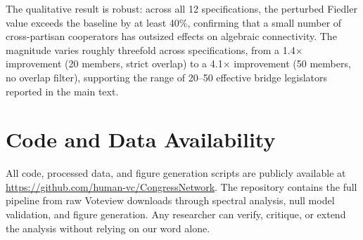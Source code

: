 \documentclass[12pt, a4paper]{article}
\begin{document}
The qualitative result is robust: across all 12 specifications, the perturbed Fiedler value exceeds the baseline by at least 40\%, confirming that a small number of cross-partisan cooperators has outsized effects on algebraic connectivity. The magnitude varies roughly threefold across specifications, from a 1.4$\times$ improvement (20 members, strict overlap) to a 4.1$\times$ improvement (50 members, no overlap filter), supporting the range of 20--50 effective bridge legislators reported in the main text.

\section{Code and Data Availability}

All code, processed data, and figure generation scripts are publicly available at \url{https://github.com/human-vc/CongressNetwork}. The repository contains the full pipeline from raw Voteview downloads through spectral analysis, null model validation, and figure generation. Any researcher can verify, critique, or extend the analysis without relying on our word alone.
\end{document}
